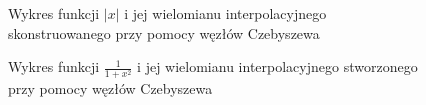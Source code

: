 \documentclass[]{article}
\begin{document}
\begin{figure}[h]
	\centering
	\caption*{Wykres funkcji $|x|$ i jej wielomianu interpolacyjnego skonstruowanego przy pomocy węzłów Czebyszewa}
	\label{fig:4}
\end{figure}
\begin{figure}[h]
	\centering
	\caption*{Wykres funkcji $\frac{1}{1+x^2}$ i jej wielomianu interpolacyjnego stworzonego przy pomocy węzłów Czebyszewa}
	\label{fig:4}
\end{figure}
\end{document}
